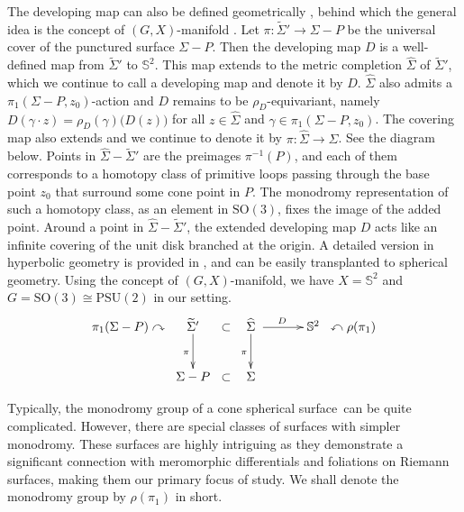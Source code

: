 \documentclass[pdflatex,sn-mathphys]{sn-jnl}%
\numberwithin{equation}{section}
\theoremstyle{thmstyleone}%
\newcommand{\RR}{\mathbb{R}}
\newcommand{\ZZ}{\mathbb{Z}}
\newcommand{\ii}{\mathbf{i}}
\newcommand{\STwo}{\mathbb{S}^2}
\newcommand{\SOthr}{\mathrm{SO}(3)}
\newcommand{\PSUtwo}{\mathrm{PSU}(2)}
\newcommand{\Uone}{\mathrm{U}(1)}
\newcommand{\Otwo}{\mathrm{O}(2)}
\newcommand{\csphsf}{cone spherical surface}
\begin{document}
The developing map can also be defined geometrically \cite{MonPa16, EMP20, MP23}, behind which the general idea is the concept of $(G, X)$-manifold \cite[Chapter 3]{Thu3D}. %
Let $\pi:\tilde{\Sigma}' \to \Sigma -P$ be the universal cover of the punctured surface $\Sigma -P$. Then the developing map $D$ is a well-defined map from $\tilde{\Sigma}'$ to $\STwo$. 
This map extends to the metric completion $\hat{\Sigma}$ of $\tilde{\Sigma}'$, which we continue to call a developing map and denote it by $D$. 
$\hat{\Sigma}$ also admits a $\pi_1(\Sigma-P, z_0)$-action and $D$ remains to be $\rho_D$-equivariant, namely 
$D(\gamma\cdot z) = \rho_D(\gamma)\big( D(z) \big)$ for all $z\in\hat{\Sigma}$ and $\gamma\in \pi_1(\Sigma-P, z_0)$.
The covering map also extends and we continue to denote it by $\pi:\hat{\Sigma} \to \Sigma$. See the diagram below.
Points in $\hat{\Sigma} - \tilde{\Sigma}'$ are the preimages $\pi^{-1}(P)$, and each of them corresponds to a homotopy class of primitive loops passing through the base point $z_0$ that surround some cone point in $P$. The monodromy representation of such a homotopy class, as an element in $\SOthr$, fixes the image of the added point. Around a point in $\hat{\Sigma} - \tilde{\Sigma}'$, the extended developing map $D$ acts like an infinite covering of the unit disk branched at the origin. 
A detailed version in hyperbolic geometry is provided in \cite[Section 2]{ELS22}, %
and can be easily transplanted to spherical geometry. Using the concept of $(G,X)$-manifold, we have $X=\STwo$ and $G=\SOthr \cong \PSUtwo$ in our setting. %
\[\xymatrix@C=1mm{%
    \pi_1(\Sigma-P) \curvearrowright & \widetilde{\Sigma}' \ar[d]_{\pi} & \subset & \ \widehat{\Sigma} \ \ar[d]_{\pi} \ar[rr]^{D}
    & \quad\quad & \mathbb{S}^2 & \curvearrowleft  \rho(\pi_1)   
    \\
     & \Sigma-P & \subset & \ \Sigma\  & & \\
    }
\]

Typically, the monodromy group of a \csphsf\ can be quite complicated. However, there are special classes of surfaces with simpler monodromy. These surfaces are highly intriguing as they demonstrate a significant connection with meromorphic differentials and foliations on Riemann surfaces, making them our primary focus of study. We shall denote the monodromy group by $\rho(\pi_1)$ in short.
\end{document}
